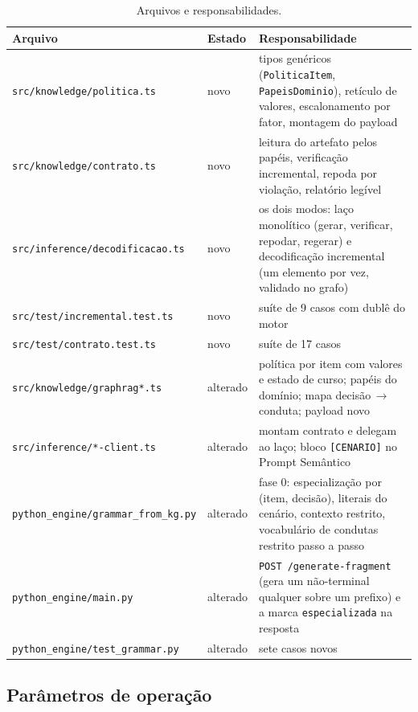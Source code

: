 \documentclass[11pt,a4paper]{article}
\begin{document}
\begin{table}[htbp]
\centering
\small
\caption{Arquivos e responsabilidades.}
\label{tab:arquivos}
\begin{tabular}{@{}p{5.6cm}p{1.5cm}p{7.6cm}@{}}
\toprule
\textbf{Arquivo} & \textbf{Estado} & \textbf{Responsabilidade} \\
\midrule
\texttt{src/knowledge/politica.ts} & novo &
tipos genéricos (\texttt{PoliticaItem}, \texttt{PapeisDominio}), retículo de
valores, escalonamento por fator, montagem do payload \\
\addlinespace
\texttt{src/knowledge/contrato.ts} & novo &
leitura do artefato pelos papéis, verificação incremental, repoda por violação,
relatório legível \\
\addlinespace
\texttt{src/inference/decodificacao.ts} & novo &
os dois modos: laço monolítico (gerar, verificar, repodar, regerar) e
decodificação incremental (um elemento por vez, validado no grafo) \\
\addlinespace
\texttt{src/test/incremental.test.ts} & novo & suíte de 9 casos com dublê do motor \\
\addlinespace
\texttt{src/test/contrato.test.ts} & novo & suíte de 17 casos \\
\addlinespace
\texttt{src/knowledge/graphrag*.ts} & alterado &
política por item com valores e estado de curso; papéis do domínio; mapa
decisão\,$\rightarrow$\,conduta; payload novo \\
\addlinespace
\texttt{src/inference/*-client.ts} & alterado &
montam contrato e delegam ao laço; bloco \texttt{[CENARIO]} no Prompt Semântico \\
\addlinespace
\texttt{python\_engine/grammar\_from\_kg.py} & alterado &
fase 0: especialização por (item, decisão), literais do cenário, contexto
restrito, vocabulário de condutas restrito passo a passo \\
\addlinespace
\texttt{python\_engine/main.py} & alterado &
\texttt{POST /generate-fragment} (gera um não-terminal qualquer sobre um
prefixo) e a marca \texttt{especializada} na resposta \\
\addlinespace
\texttt{python\_engine/test\_grammar.py} & alterado & sete casos novos \\
\bottomrule
\end{tabular}
\end{table}

\subsection{Parâmetros de operação}
\end{document}
